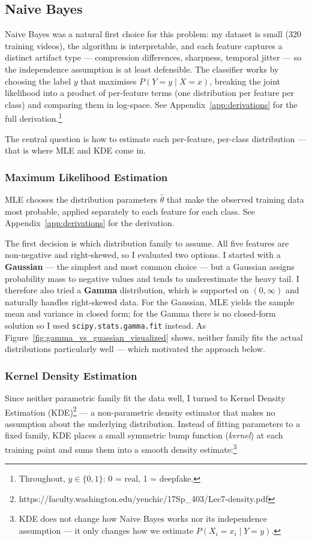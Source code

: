\documentclass{article}
\begin{document}
\subsection*{Naive Bayes}
Naive Bayes was a natural first choice for this problem: my dataset is small (320 training videos), the algorithm is interpretable, and each feature captures a distinct artifact type --- compression differences, sharpness, temporal jitter --- so the independence assumption is at least defensible. The classifier works by choosing the label $y$ that maximises $P(Y = y \mid X = x)$, breaking the joint likelihood into a product of per-feature terms (one distribution per feature per class) and comparing them in log-space. See Appendix~\ref{app:derivations} for the full derivation.\footnote{Throughout, $y \in \{0, 1\}$: 0 = real, 1 = deepfake.}

The central question is how to estimate each per-feature, per-class distribution --- that is where MLE and KDE come in.

\subsubsection*{Maximum Likelihood Estimation}

MLE chooses the distribution parameters $\hat\theta$ that make the observed training data most probable, applied separately to each feature for each class. See Appendix~\ref{app:derivations} for the derivation.

The first decision is which distribution family to assume. All five features are non-negative and right-skewed, so I evaluated two options. I started with a \textbf{Gaussian} --- the simplest and most common choice --- but a Gaussian assigns probability mass to negative values and tends to underestimate the heavy tail. I therefore also tried a \textbf{Gamma} distribution, which is supported on $(0, \infty)$ and naturally handles right-skewed data. For the Gaussian, MLE yields the sample mean and variance in closed form; for the Gamma there is no closed-form solution so I used \verb|scipy.stats.gamma.fit| instead. As Figure~\ref{fig:gamma_vs_guassian_visualized} shows, neither family fits the actual distributions particularly well --- which motivated the approach below.

\subsubsection*{Kernel Density Estimation}
Since neither parametric family fit the data well, I turned to Kernel Density Estimation (KDE)\footnote{https://faculty.washington.edu/yenchic/17Sp\_403/Lec7-density.pdf} --- a non-parametric density estimator that makes no assumption about the underlying distribution. Instead of fitting parameters to a fixed family, KDE places a small symmetric bump function (\textit{kernel}) at each training point and sums them into a smooth density estimate:\footnote{KDE does not change how Naive Bayes works nor its independence assumption --- it only changes how we estimate $P(X_i = x_i \mid Y = y)$.}
\end{document}
